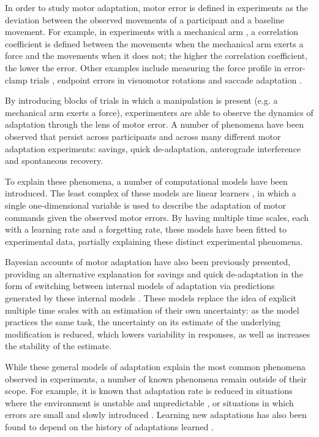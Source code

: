 \documentclass[a4paper,doc,floatsintext,natbib]{apa6}
\begin{document}
In order to study motor adaptation, motor error is defined in experiments as the deviation between the observed movements of a participant and a baseline movement. For example, in experiments with a mechanical arm \citep[e.g.][]{Gandolfo_Motor_1996}, a correlation coefficient is defined between the movements when the mechanical arm exerts a force and the movements when it does not; the higher the correlation coefficient, the lower the error. Other examples include measuring the force profile in error-clamp trials \citep{Smith_Interacting_2006}, endpoint errors in visuomotor rotations \citep{Kim_Neural_2015} and saccade adaptation \citep{Catz_Cerebellardependent_2008}.

By introducing blocks of trials in which a manipulation is present (e.g. a mechanical arm exerts a force), experimenters are able to observe the dynamics of adaptation through the lens of motor error. A number of phenomena have been observed that persist across participants and across many different motor adaptation experiments: savings, quick de-adaptation, anterograde interference and spontaneous recovery.

To explain these phenomena, a number of computational models have been introduced. The least complex of these models are linear learners \citep[e.g.][]{Smith_Interacting_2006,Forano_Timescales_2020,Scheidt_Learning_2001}, in which a single one-dimensional variable is used to describe the adaptation of motor commands given the observed motor errors. By having multiple time scales, each with a learning rate and a forgetting rate, these models have been fitted to experimental data, partially explaining these distinct experimental phenomena.

Bayesian accounts of motor adaptation have also been previously presented, providing an alternative explanation for savings and quick de-adaptation in the form of switching between internal models of adaptation via predictions generated by these internal models \citep{Kording_Bayesian_2004,Oh_Minimizing_2019}. These models replace the idea of explicit multiple time scales with an estimation of their own uncertainty: as the model practices the same task, the uncertainty on its estimate of the underlying modification is reduced, which lowers variability in responses, as well as increases the stability of the estimate.

While these general models of adaptation explain the most common phenomena observed in experiments, a number of known phenomena remain outside of their scope. For example, it is known that adaptation rate is reduced in situations where the environment is unstable and unpredictable \citep{Herzfeld_memory_2014}, or situations in which errors are small \citep{Marko_Sensitivity_2012} and slowly introduced \citep{Huang_Persistence_2009}. Learning new adaptations has also been found to depend on the history of adaptations learned \citep{Vaswani_Decay_2013}.
\end{document}
